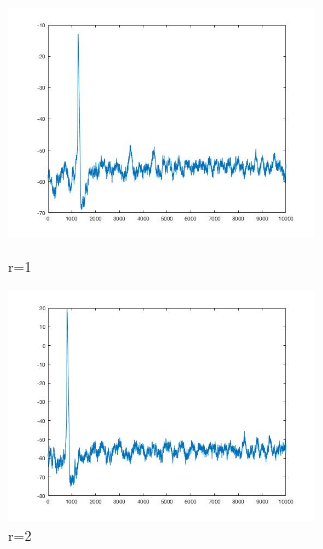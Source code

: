 \documentclass[
    bachelor,
    nofont, %
    pdflinks,
    ]{xjtuthesis}
\begin{document}
\begin{figure}
\begin{minipage}[!ht]{0.5\linewidth}
\centering
\includegraphics[width=3.2in]{p10r1_2.jpg}
\caption{r=1}
\end{minipage}%
\begin{minipage}[!ht]{0.5\linewidth}
\centering
\includegraphics[width=3.2in]{p10r2_2.jpg}
\caption{r=2}
\end{minipage}
\end{figure}


\medskip

    \xjtuendcontent



    \xjtuappendix
\end{document}
